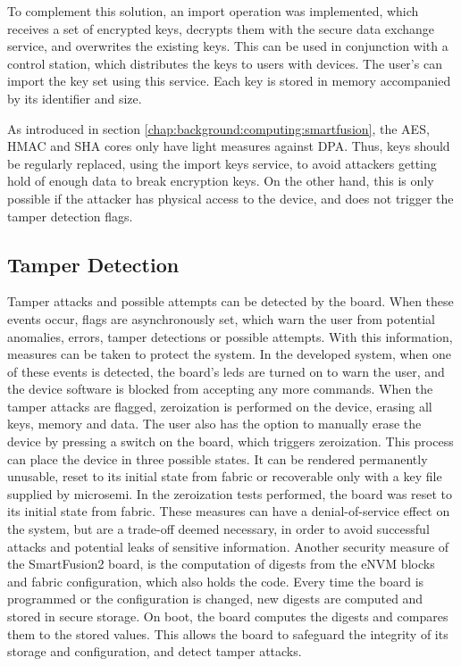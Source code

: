 To complement this solution, an import operation was implemented, which receives a set of encrypted keys, decrypts them with the secure data exchange service, and overwrites the existing keys. This can be used in conjunction with a control station, which distributes the keys to users with devices. The user's can import the key set using this service.
Each key is stored in memory accompanied by its identifier and size.

As introduced in section \ref{chap:background:computing:smartfusion}, the AES, HMAC and SHA cores only have light measures against DPA. Thus, keys should be regularly replaced, using the import keys service, to avoid attackers getting hold of enough data to break encryption keys. On the other hand, this is only possible if the attacker has physical access to the device, and does not trigger the tamper detection flags. 

\subsection{Tamper Detection}\label{chap:implementation:services:tamper-detection}

Tamper attacks and possible attempts can be detected by the board. When these events occur, flags are asynchronously set, which warn the user from potential anomalies, errors, tamper detections or possible attempts. With this information, measures can be taken to protect the system.
In the developed system, when one of these events is detected, the board's leds are turned on to warn the user, and the device software is blocked from accepting any more commands.
When the tamper attacks are flagged, zeroization is performed on the device, erasing all keys, memory and data.
The user also has the option to manually erase the device by pressing a switch on the board, which triggers zeroization.
This process can place the device in three possible states. It can be rendered permanently unusable, reset to its initial state from fabric or recoverable only with a key file supplied by microsemi. In the zeroization tests performed, the board was reset to its initial state from fabric.
These measures can have a denial-of-service effect on the system, but are a trade-off deemed necessary, in order to avoid successful attacks and potential leaks of sensitive information.
Another security measure of the SmartFusion2 board, is the computation of digests from the eNVM blocks and fabric configuration, which also holds the code. Every time the board is programmed or the configuration is changed, new digests are computed and stored in secure storage. On boot, the board computes the digests and compares them to the stored values. This allows the board to safeguard the integrity of its storage and configuration, and detect tamper attacks.

